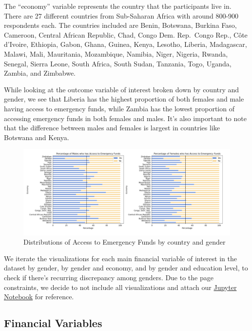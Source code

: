 \documentclass[12pt]{article}
\begin{document}
The ``economy'' variable represents the country that the participants
live in. There are 27 different countries from Sub-Saharan Africa with
around 800-900 respondents each. The countries included are Benin,
Botswana, Burkina Faso, Cameroon, Central African Republic, Chad, Congo
Dem. Rep.~Congo Rep., Côte d'Ivoire, Ethiopia, Gabon, Ghana, Guinea,
Kenya, Lesotho, Liberia, Madagascar, Malawi, Mali, Mauritania,
Mozambique, Namibia, Niger, Nigeria, Rwanda, Senegal, Sierra Leone,
South Africa, South Sudan, Tanzania, Togo, Uganda, Zambia, and Zimbabwe.

While looking at the outcome variable of interest broken down by country
and gender, we see that Liberia has the highest proportion of both
females and male having access to emergency funds, while Zambia has the
lowest proportion of accessing emergency funds in both females and
males. It's also important to note that the difference between males and
females is largest in countries like Botswana and Kenya.

\begin{figure}

{\centering \includegraphics[width=1\linewidth]{graphs/country_graph10} 

}

\caption{Distributions of Access to Emergency Funds by country and gender}\label{fig:unnamed-chunk-13}
\end{figure}

We iterate the visualizations for each main financial variable of
interest in the dataset by gender, by gender and economy, and by gender
and education level, to check if there's recurring discrepancy among
genders. Due to the page constraints, we decide to not include all
visualizations and attach our
\href{https://colab.research.google.com/drive/10Fwjp8X8FvKoSy_AWASBTrHFwgOQOOWn}{Jupyter
Notebook} for reference.

\hypertarget{financial-variables}{%
\subsection{Financial Variables}\label{financial-variables}}
\end{document}
